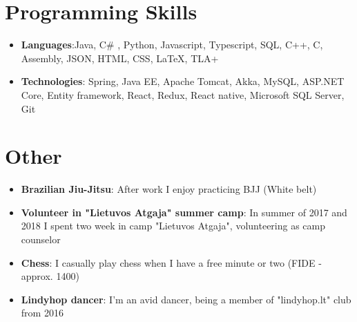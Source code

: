 \documentclass[letterpaper,11pt]{article}
\newcommand{\resumeItem}[2]{
  \item\small{
    \textbf{#1}{: #2 \vspace{-2pt}}
  }
}
\newcommand{\resumeSubItem}[2]{\resumeItem{#1}{#2}\vspace{-4pt}}
\newcommand{\resumeSubHeadingListStart}{\begin{itemize}[leftmargin=*]}
\newcommand{\resumeSubHeadingListEnd}{\end{itemize}}
\begin{document}
\section{Programming Skills}
  \resumeSubHeadingListStart
    \item{
      \textbf{Languages}{:Java, C\# , Python, Javascript, Typescript, SQL, C++, C, Assembly, JSON, HTML, CSS, LaTeX, TLA+}
      \hfill
    }
    \item{
	\textbf{Technologies}{: Spring, Java EE, Apache Tomcat, Akka, MySQL, ASP.NET Core, Entity framework, React, Redux, React native,  Microsoft SQL Server, Git}
	\hfil
	}
  \resumeSubHeadingListEnd
\section{Other}
  \resumeSubHeadingListStart
    \resumeSubItem{Brazilian Jiu-Jitsu}
      {After work I enjoy practicing BJJ (White belt)}
    \resumeSubItem{Volunteer in "Lietuvos Atgaja" summer camp}
      {In summer of 2017 and 2018 I spent two week in camp "Lietuvos Atgaja", volunteering as camp counselor}
    \resumeSubItem{Chess}
      {I casually play chess when I have a free minute or two (FIDE - approx. 1400)}
    \resumeSubItem{Lindyhop dancer}
      {I'm an avid dancer, being a member of "lindyhop.lt" club from 2016 }
  \resumeSubHeadingListEnd
\end{document}
